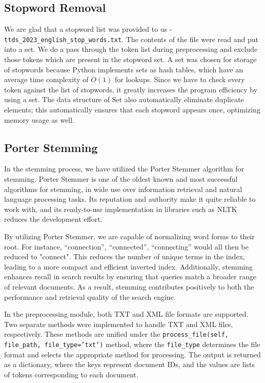 \subsection*{Stopword Removal}
We are glad that a stopword list was provided to us - \texttt{ttds\_2023\_english\_stop\_words.txt}. The contents of the file were read and put into a set. We do a pass through the token list during preprocessing and exclude those tokens which are present in the stopword set. A set was chosen for storage of stopwords because Python implements sets as hash tables, which have an average time complexity of $O(1)$ for lookups. Since we have to check every token against the list of stopwords, it greatly increases the program efficiency by using a set. The data structure of Set also automatically eliminate duplicate elements; this automatically ensures that each stopword appears once, optimizing memory usage as well.

\subsection*{Porter Stemming}
In the stemming process, we have utilized the Porter Stemmer algorithm for stemming. Porter Stemmer is one of the oldest known and most successful algorithms for stemming, in wide use over information retrieval and natural language processing tasks. Its reputation and authority make it quite reliable to work with, and its ready-to-use implementation in libraries such as NLTK reduces the development effort.

By utilizing Porter Stemmer, we are capable of normalizing word forms to their root. For instance, ``connection'', ``connected'', ``connecting'' would all then be reduced to "connect". This reduces the number of unique terms in the index, leading to a more compact and efficient inverted index. Additionally, stemming enhances recall in search results by ensuring that queries match a broader range of relevant documents. As a result, stemming contributes positively to both the performance and retrieval quality of the search engine.\newline

In the preprocessing module, both TXT and XML file formats are supported. Two separate methods were implemented to handle TXT and XML files, respectively. These methods are unified under the \texttt{process\_file(self, file\_path, file\_type='txt')} method, where the \texttt{file\_type} determines the file format and selects the appropriate method for processing. The output is returned as a dictionary, where the keys represent document IDs, and the values are lists of tokens corresponding to each document.